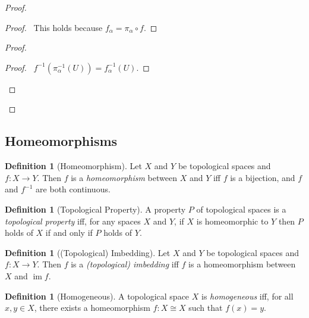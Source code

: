 \documentclass{report}
\let\qed\relax
\theoremstyle{definition}
\newtheorem{df}[lm]{Definition}
\newcommand{\im}{\ensuremath{\operatorname{im}}}
\begin{document}
  \begin{proof}
    \pf
    \begin{proof}
      \pf\ This holds because $f_\alpha = \pi_\alpha \circ f$.
    \end{proof}
    \begin{proof}
      \begin{proof}
        \pf\ $f^{-1}(\pi_\alpha^{-1}(U)) = f_\alpha^{-1}(U)$.
      \end{proof}
    \end{proof}
    \qed
  \end{proof}



  \subsection{Homeomorphisms}

  \begin{df}[Homeomorphism]
    Let $X$ and $Y$ be topological spaces and $f : X \rightarrow Y$. Then $f$
    is
    a
    \emph{homeomorphism} between $X$ and $Y$ iff $f$ is a bijection, and $f$
    and
    $f^{-1}$ are both continuous.
  \end{df}

  \begin{df}[Topological Property]
    A property $P$ of topological spaces is a \emph{topological property} iff,
    for any spaces $X$ and $Y$, if $X$ is homeomorphic to $Y$ then $P$ holds of
    $X$
    if and only if $P$ holds of $Y$.
  \end{df}

  \begin{df}[(Topological) Imbedding]
    Let $X$ and $Y$ be topological spaces and $f : X \rightarrow Y$. Then $f$
    is
    a
    \emph{(topological) imbedding} iff $f$ is a homeomorphism between $X$ and
    $\im f$.
  \end{df}

  \begin{df}[Homogeneous]
    A topological space $X$ is \emph{homogeneous} iff, for all $x, y \in X$,
    there exists a homeomorphism $f : X \cong X$ such that $f(x) = y$.
  \end{df}
\end{document}
